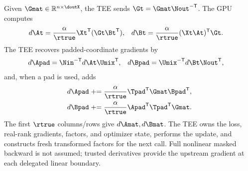 Given $\Gmat\in\mathbb{R}^{n\times\doutX}$, the TEE sends
$\Gt=\Gmat\Nout^{-\mathsf T}$. The GPU computes
\begin{align}
d\At&=\frac{\alpha}{\rtrue}\Xt^{\mathsf T}
       (\Gt\Bt^{\mathsf T}),&
d\Bt&=\frac{\alpha}{\rtrue}(\Xt\At)^{\mathsf T}\Gt.
\label{eq:app-lora-backward}
\end{align}
The TEE recovers padded-coordinate gradients by
\begin{align}
d\Apad&=\Nin^{-\mathsf T}d\At\Umix^{\mathsf T},&
d\Bpad&=\Umix^{-\mathsf T}d\Bt\Nout^{\mathsf T},
\label{eq:app-lora-gradient-recovery}
\end{align}
and, when a pad is used, adds
\begin{align}
d\Apad&\mathrel{+}=\frac{\alpha}{\rtrue}
 \Tpad^{\mathsf T}\Gmat\Bpad^{\mathsf T},\\
d\Bpad&\mathrel{+}=\frac{\alpha}{\rtrue}
 \Apad^{\mathsf T}\Tpad^{\mathsf T}\Gmat.
\label{eq:app-lora-gradient-pad}
\end{align}
The first $\rtrue$ columns/rows give $d\Amat,d\Bmat$. The TEE owns the loss,
real-rank gradients, factors, and optimizer state, performs the update, and
constructs fresh transformed factors for the next call. Full nonlinear masked
backward is not assumed; trusted derivatives provide the upstream gradient at
each delegated linear boundary.
